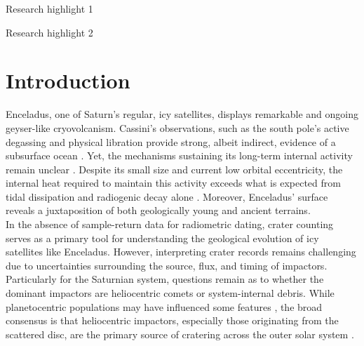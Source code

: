 \documentclass[preprint,11pt,3p,times,authoryear]{elsarticle}
\begin{document}
\begin{frontmatter}
\begin{highlights}
\item Research highlight 1
\item Research highlight 2
\end{highlights}

\begin{keyword}



\end{keyword}

\end{frontmatter}


\linenumbers
\section{Introduction}
\label{intro}

Enceladus, one of Saturn's regular, icy satellites, displays remarkable and ongoing geyser-like cryovolcanism. Cassini’s observations, such as the south pole’s active degassing \citep{Porco2004,Spencer2006} and physical libration \citep{Thomas2016,Nimmo2023} provide strong, albeit indirect, evidence of a subsurface ocean \citep{Porco2004,Spencer2006}. Yet, the mechanisms sustaining its long-term internal activity remain unclear \citep{Nimmo2023}. Despite its small size and current low orbital eccentricity, the internal heat required to maintain this activity exceeds what is expected from tidal dissipation and radiogenic decay alone \citep{Meyer2007,Roberts2008}. Moreover, Enceladus' surface reveals a juxtaposition of both geologically young and ancient terrains.\\

In the absence of sample-return data for radiometric dating, crater counting serves as a primary tool for understanding the geological evolution of icy satellites like Enceladus. However, interpreting crater records remains challenging due to uncertainties surrounding the source, flux, and timing of impactors. Particularly for the Saturnian system, questions remain as to whether the dominant impactors are heliocentric comets or system-internal debris. While planetocentric populations may have influenced some features \citep{Ferguson2022}, the broad consensus is that heliocentric impactors, especially those originating from the scattered disc, are the primary source of cratering across the outer solar system \citep{Shoemaker1982,Chapman1986,Zahnle1998,Nesvorny2019,Wong2023,Nesvorny2023}. \\
\end{document}
